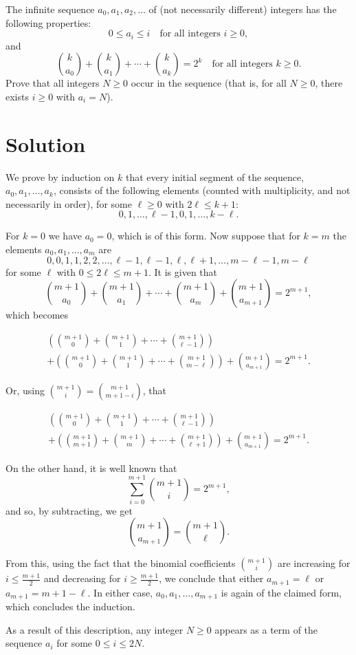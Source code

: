 \begin{problem}
    The infinite sequence $a_0, a_1, a_2, \ldots$ of (not necessarily different) integers has the following properties: 
    \[
    0 \leq a_i \leq i \quad \text{for all integers } i \geq 0,
    \]
    and
    \[
    \binom{k}{a_0} + \binom{k}{a_1} + \cdots + \binom{k}{a_k} = 2^k
    \quad \text{for all integers } k \geq 0.
    \]
    Prove that all integers $N \geq 0$ occur in the sequence (that is, for all $N \geq 0$, there exists $i \geq 0$ with $a_i = N$).
\end{problem}

\section*{Solution}

We prove by induction on $k$ that every initial segment of the sequence, $a_0, a_1, \ldots, a_k$, consists of the following elements (counted with multiplicity, and not necessarily in order), for some $\ell \geq 0$ with $2\ell \leq k+1$:
\[
0, 1, \ldots, \ell - 1, 0, 1, \ldots, k - \ell.
\]

For $k = 0$ we have $a_0 = 0$, which is of this form. Now suppose that for $k = m$ the elements $a_0, a_1, \ldots, a_m$ are 
\[
0, 0, 1, 1, 2, 2, \ldots, \ell - 1, \ell - 1, \ell, \ell + 1, \ldots, m - \ell - 1, m - \ell
\]
for some $\ell$ with $0 \leq 2\ell \leq m + 1$. It is given that
\[
\binom{m+1}{a_0} + \binom{m+1}{a_1} + \cdots + \binom{m+1}{a_m} + \binom{m+1}{a_{m+1}} = 2^{m+1},
\]
which becomes

\begin{multline*}
\left( \binom{m+1}{0} + \binom{m+1}{1} + \cdots + \binom{m+1}{\ell - 1} \right) \\
+ \left( \binom{m+1}{0} + \binom{m+1}{1} + \cdots + \binom{m+1}{m - \ell} \right)
+ \binom{m+1}{a_{m+1}} = 2^{m+1}.
\end{multline*}

Or, using $\binom{m+1}{i} = \binom{m+1}{m+1 - i}$, that

\begin{multline*}
\left( \binom{m+1}{0} + \binom{m+1}{1} + \cdots + \binom{m+1}{\ell - 1} \right) \\
+ \left( \binom{m+1}{m+1} + \binom{m+1}{m} + \cdots + \binom{m+1}{\ell+1} \right)
+ \binom{m+1}{a_{m+1}} = 2^{m+1}.
\end{multline*}

On the other hand, it is well known that
\[
\sum_{i=0}^{m+1} \binom{m+1}{i} = 2^{m+1},
\]
and so, by subtracting, we get
\[
\binom{m+1}{a_{m+1}} = \binom{m+1}{\ell}.
\]

From this, using the fact that the binomial coefficients $\binom{m+1}{i}$ are increasing for $i \leq \frac{m+1}{2}$ and decreasing for $i \geq \frac{m+1}{2}$, we conclude that either $a_{m+1} = \ell$ or $a_{m+1} = m + 1 - \ell$. In either case, $a_0, a_1, \ldots, a_{m+1}$ is again of the claimed form, which concludes the induction.

As a result of this description, any integer $N \geq 0$ appears as a term of the sequence $a_i$ for some $0 \leq i \leq 2N$.